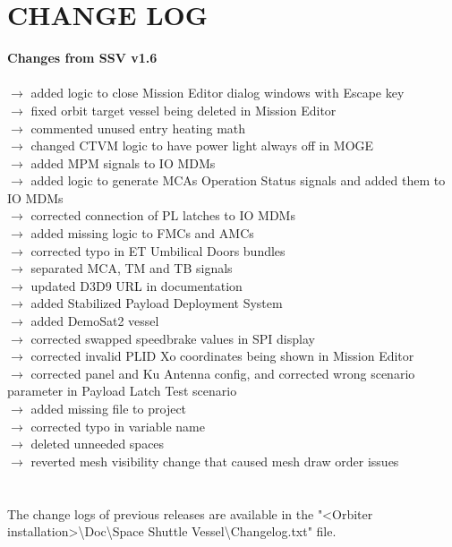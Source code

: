 \documentclass[Space_Shuttle_Vessel_Manual.tex]{subfiles}
\begin{document}
\section{CHANGE LOG}
\label{sec:change-log}
\noindent
\textbf{Changes from SSV v1.6}\\\\
$\rightarrow$ added logic to close Mission Editor dialog windows with Escape key\\
$\rightarrow$ fixed orbit target vessel being deleted in Mission Editor\\
$\rightarrow$ commented unused entry heating math\\
$\rightarrow$ changed CTVM logic to have power light always off in MOGE\\
$\rightarrow$ added MPM signals to IO MDMs\\
$\rightarrow$ added logic to generate MCAs Operation Status signals and added them to IO MDMs\\
$\rightarrow$ corrected connection of PL latches to IO MDMs\\
$\rightarrow$ added missing logic to FMCs and AMCs\\
$\rightarrow$ corrected typo in ET Umbilical Doors bundles\\
$\rightarrow$ separated MCA, TM and TB signals\\
$\rightarrow$ updated D3D9 URL in documentation\\
$\rightarrow$ added Stabilized Payload Deployment System\\
$\rightarrow$ added DemoSat2 vessel\\
$\rightarrow$ corrected swapped speedbrake values in SPI display\\
$\rightarrow$ corrected invalid PLID Xo coordinates being shown in Mission Editor\\
$\rightarrow$ corrected panel and Ku Antenna config, and corrected wrong scenario parameter in Payload Latch Test scenario\\
$\rightarrow$ added missing file to project\\
$\rightarrow$ corrected typo in variable name\\
$\rightarrow$ deleted unneeded spaces\\
$\rightarrow$ reverted mesh visibility change that caused mesh draw order issues\\
\\
\\
The change logs of previous releases are available in the "<Orbiter installation>\textbackslash Doc\textbackslash Space Shuttle Vessel\textbackslash Changelog.txt" file.
\end{document}
